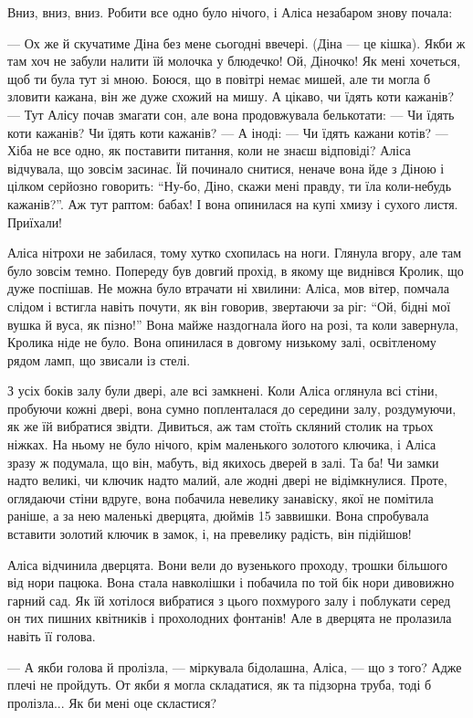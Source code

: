 Вниз, вниз, вниз. Робити все одно було нічого, і Аліса незабаром знову почала:

— Ох же й скучатиме Діна без мене сьогодні ввечері. (Діна — це кішка). Якби ж
там хоч не забули налити їй молочка у блюдечко! Ой, Діночко! Як мені хочеться,
щоб ти була тут зі мною. Боюся, що в повітрі немає мишей, але ти могла б
зловити кажана, він же дуже схожий на мишу. А цікаво, чи їдять коти кажанів? —
Тут Алісу почав змагати сон, але вона продовжувала белькотати: — Чи їдять коти
кажанів? Чи їдять коти кажанів? — А іноді: — Чи їдять кажани котів? — Хіба не
все одно, як поставити питання, коли не знаєш відповіді? Аліса відчувала, що
зовсім засинає. Їй починало снитися, неначе вона йде з Діною і цілком серйозно
говорить: \enquote{Ну-бо, Діно, скажи мені правду, ти їла коли-небудь кажанів?}. Аж тут
раптом: бабах! І вона опинилася на купі хмизу і сухого листя. Приїхали!

Аліса нітрохи не забилася, тому хутко схопилась на ноги. Глянула вгору, але там
було зовсім темно. Попереду був довгий прохід, в якому ще виднівся Кролик, що
дуже поспішав. Не можна було втрачати ні хвилини: Аліса, мов вітер, помчала
слідом і встигла навіть почути, як він говорив, звертаючи за ріг: \enquote{Ой, бідні
мої вушка й вуса, як пізно!} Вона майже наздогнала його на розі, та коли
завернула, Кролика ніде не було. Вона опинилася в довгому низькому залі,
освітленому рядом ламп, що звисали із стелі.

З усіх боків залу були двері, але всі замкнені. Коли Аліса оглянула всі стіни,
пробуючи кожні двері, вона сумно попленталася до середини залу, роздумуючи, як
же їй вибратися звідти. Дивиться, аж там стоїть скляний столик на трьох ніжках.
На ньому не було нічого, крім маленького золотого ключика, і Аліса зразу ж
подумала, що він, мабуть, від якихось дверей в залі. Та ба! Чи замки надто
великі, чи ключик надто малий, але жодні двері не відімкнулися. Проте,
оглядаючи стіни вдруге, вона побачила невелику занавіску, якої не помітила
раніше, а за нею маленькі дверцята, дюймів 15 заввишки. Вона спробувала
вставити золотий ключик в замок, і, на превелику радість, він підійшов!

Аліса відчинила дверцята. Вони вели до вузенького проходу, трошки більшого від
нори пацюка. Вона стала навколішки і побачила по той бік нори дивовижно гарний
сад. Як їй хотілося вибратися з цього похмурого залу і поблукати серед он тих
пишних квітників і прохолодних фонтанів! Але в дверцята не пролазила навіть її
голова.

— А якби голова й пролізла, — міркувала бідолашна, Аліса, — що з того? Адже
плечі не пройдуть. От якби я могла складатися, як та підзорна труба, тоді б
пролізла... Як би мені оце скластися?

